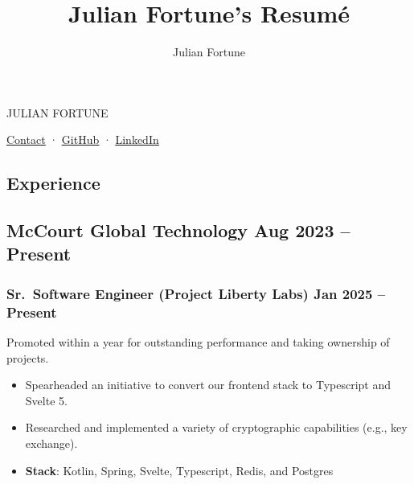 \documentclass[10pt]{article} %
\title{Julian Fortune's Resumé}
\author{Julian Fortune}
\providecommand{\tightlist}{%
  \setlength{\itemsep}{0pt}\setlength{\parskip}{0pt}}
\let\defaultref\href
\renewcommand{\href}[2]{%
  \defaultref{#1}{\ul{#2}}%
}
\newcommand{\link}[2]{\href{#1}{#2}}
\def\separator{ · {}}
\begin{document}
\begin{bfseries}\begin{huge}
  {\selectfont%
    \MakeTextUppercase{Julian Fortune}
  }
\end{huge}\end{bfseries}

  \link{https://forms.gle/KkSirNbEgQozTH2x7}{Contact}\separator%
    \link{http://github.com/julianfortune}{GitHub}\separator%
\link{http://linkedin.com/in/julianfortune}{LinkedIn}%


\begin{paracol}{2}
\setlength{\columnsep}{1em}

\hypertarget{experience}{%
\section{Experience}\label{experience}}

\hypertarget{mccourt-global-technology-aug-2023-present}{%
\subsection{\texorpdfstring{McCourt Global Technology \hfill \small Aug
2023 --
Present}{McCourt Global Technology Aug 2023 -- Present}}\label{mccourt-global-technology-aug-2023-present}}

\vspace{-3pt}

\hypertarget{sr.-software-engineer-project-liberty-labs-jan-2025-present}{%
\subsubsection{\texorpdfstring{\small Sr.~Software Engineer (Project
Liberty Labs) \hfill \small Jan 2025 --
Present}{Sr.~Software Engineer (Project Liberty Labs) Jan 2025 -- Present}}\label{sr.-software-engineer-project-liberty-labs-jan-2025-present}}

\vspace{-3pt}

Promoted within a year for outstanding performance and taking ownership
of projects.

\begin{itemize}
\tightlist
\item
  Spearheaded an initiative to convert our frontend stack to Typescript
  and Svelte 5.
\item
  Researched and implemented a variety of cryptographic capabilities
  (e.g., key exchange).
\item
  \textbf{Stack}: Kotlin, Spring, Svelte, Typescript, Redis, and
  Postgres
\end{itemize}


\end{paracol}
\end{document}
